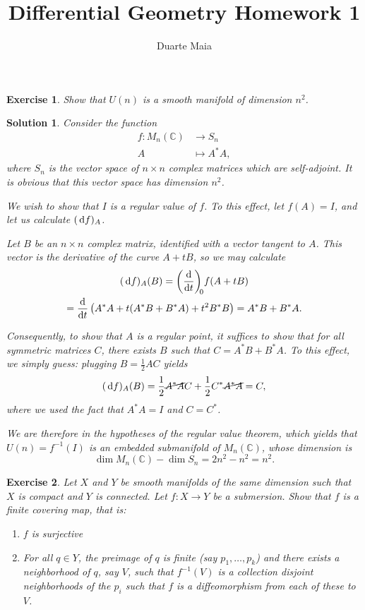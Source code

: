 \documentclass{article}
\title{Differential Geometry Homework 1}
\author{Duarte Maia}
\date{}
\newtheorem{ex}{Exercise}
\theoremstyle{nonumberplain}
\newtheorem{sol}{Solution}
\newcommand{\C}{\mathbb{C}}
\begin{document}
\maketitle

\begin{ex}
Show that $U(n)$ is a smooth manifold of dimension $n^2$.
\end{ex}

\begin{sol}
Consider the function
\begin{align*}
f \colon M_n(\C) &\to S_n\\
A &\mapsto A^* A,
\end{align*}
where $S_n$ is the vector space of $n \times n$ complex matrices which are self-adjoint. It is obvious that this vector space has dimension $n^2$.

We wish to show that $I$ is a regular value of $f$. To this effect, let $f(A) = I$, and let us calculate $(\dl f)_A$.

Let $B$ be an $n \times n$ complex matrix, identified with a vector tangent to $A$. This vector is the derivative of the curve $A + tB$, so we may calculate
\begin{multline*}
(\dl f)_A(B) = \diff{}t[0] f(A + tB)\\
=\diff{}t \left(A^* A + t (A^* B + B^* A) + t^2 B^* B \right) = A^* B + B^* A.
\end{multline*}

Consequently, to show that $A$ is a regular point, it suffices to show that for all symmetric matrices $C$, there exists $B$ such that $C = A^* B + B^* A$. To this effect, we simply guess: plugging $B = \frac12 A C$ yields
\[(\dl f)_A(B) = \frac12 \cancel{A^* A} C + \frac12 C^* \cancel{A^* A} = C,\]
where we used the fact that $A^* A = I$ and $C = C^*$.

We are therefore in the hypotheses of the regular value theorem, which yields that $U(n) = f^{-1}(I)$ is an embedded submanifold of $M_n(\C)$, whose dimension is
\[\dim M_n(\C) - \dim S_n = 2 n^2 - n^2 = n^2.\]
\end{sol}

\begin{ex}
Let $X$ and $Y$ be smooth manifolds of the same dimension such that $X$ is compact and $Y$ is connected. Let $f \colon X \to Y$ be a submersion. Show that $f$ is a finite covering map, that is:

\begin{enumerate}
\item $f$ is surjective

\item For all $q \in Y$, the preimage of $q$ is finite (say $p_1, \dots, p_k$) and there exists a neighborhood of $q$, say $V$, such that $f^{-1}(V)$ is a collection disjoint neighborhoods of the $p_i$ such that $f$ is a diffeomorphism from each of these to $V$.
\end{enumerate}
\end{ex}
\end{document}

